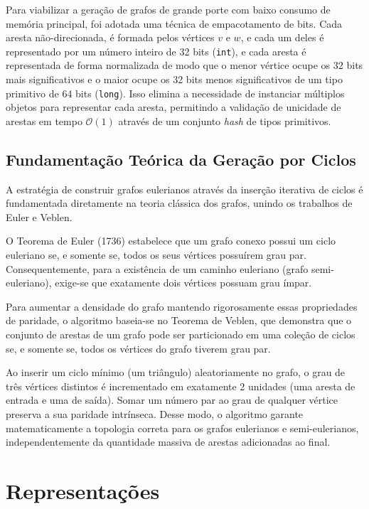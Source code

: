 \documentclass[12pt]{article}
\begin{document}
Para viabilizar a geração de grafos de grande porte com baixo consumo de memória principal, foi adotada uma técnica de empacotamento de bits. Cada aresta não-direcionada, é formada pelos vértices $v$ e $w$, e cada um deles é representado por um número inteiro de 32 bits (\texttt{int}), e cada aresta é representada de forma normalizada de modo que o menor vértice ocupe os 32 bits mais significativos e o maior ocupe os 32 bits menos significativos de um tipo primitivo de 64 bits (\texttt{long}). Isso elimina a necessidade de instanciar múltiplos objetos para representar cada aresta, permitindo a validação de unicidade de arestas em tempo $\mathcal{O}(1)$ através de um conjunto \textit{hash} de tipos primitivos.

\subsection{Fundamentação Teórica da Geração por Ciclos}

A estratégia de construir grafos eulerianos através da inserção iterativa de ciclos é fundamentada diretamente na teoria clássica dos grafos, unindo os trabalhos de Euler e Veblen.

O Teorema de Euler (1736) estabelece que um grafo conexo possui um ciclo euleriano se, e somente se, todos os seus vértices possuírem grau par. Consequentemente, para a existência de um caminho euleriano (grafo semi-euleriano), exige-se que exatamente dois vértices possuam grau ímpar. \cite{Euler1736}

Para aumentar a densidade do grafo mantendo rigorosamente essas propriedades de paridade, o algoritmo baseia-se no Teorema de Veblen, que demonstra que o conjunto de arestas de um grafo pode ser particionado em uma coleção de ciclos se, e somente se, todos os vértices do grafo tiverem grau par. \cite{Veblen1912}

Ao inserir um ciclo mínimo (um triângulo) aleatoriamente no grafo, o grau de três vértices distintos é incrementado em exatamente 2 unidades (uma aresta de entrada e uma de saída). Somar um número par ao grau de qualquer vértice preserva a sua paridade intrínseca. Desse modo, o algoritmo garante matematicamente a topologia correta para os grafos eulerianos e semi-eulerianos, independentemente da quantidade massiva de arestas adicionadas ao final.

\section{Representações}
\end{document}
